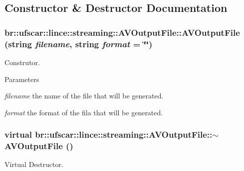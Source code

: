 \subsection{Constructor \& Destructor Documentation}
\hypertarget{classbr_1_1ufscar_1_1lince_1_1streaming_1_1AVOutputFile_ace075f9dcbf56a275f646dcf5ca5075d}{
\subsubsection[{AVOutputFile}]{\setlength{\rightskip}{0pt plus 5cm}br::ufscar::lince::streaming::AVOutputFile::AVOutputFile (string {\em filename}, \/  string {\em format} = {\ttfamily \char`\"{}\char`\"{}})}}
\label{classbr_1_1ufscar_1_1lince_1_1streaming_1_1AVOutputFile_ace075f9dcbf56a275f646dcf5ca5075d}


Construtor. 


\begin{DoxyParams}{Parameters}
\item[{\em filename}]the name of the file that will be generated. \item[{\em format}]the format of the fila that will be generated. \end{DoxyParams}
\hypertarget{classbr_1_1ufscar_1_1lince_1_1streaming_1_1AVOutputFile_a867bc52c953208f0ed240450a6a219e9}{
\subsubsection[{$\sim$AVOutputFile}]{\setlength{\rightskip}{0pt plus 5cm}virtual br::ufscar::lince::streaming::AVOutputFile::$\sim$AVOutputFile ()}}
\label{classbr_1_1ufscar_1_1lince_1_1streaming_1_1AVOutputFile_a867bc52c953208f0ed240450a6a219e9}


Virtual Destructor. 



